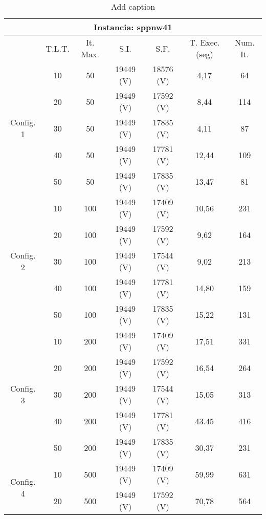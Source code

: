 \begin{table}[htbp]
  \centering
  \caption{Add caption}
    \begin{tabular}{rcccccc}
    \toprule
    \multicolumn{7}{c}{Instancia: sppnw41} \\
    \midrule
          & T.L.T. & It. Max. & S.I.  & S.F.  & T. Exec. (seg) & Num. It. \\
    \multicolumn{1}{c}{\multirow{5}[2]{*}{Config. 1}} & 10    & 50    & 19449 (V) & 18576 (V) & 4,17  & 64 \\
    \multicolumn{1}{c}{} & 20    & 50    & 19449 (V) & 17592 (V) & 8,44  & 114 \\
    \multicolumn{1}{c}{} & 30    & 50    & 19449 (V) & 17835 (V) & 4,11  & 87 \\
    \multicolumn{1}{c}{} & 40    & 50    & 19449 (V) & 17781 (V) & 12,44 & 109 \\
    \multicolumn{1}{c}{} & 50    & 50    & 19449 (V) & 17835 (V) & 13,47 & 81 \\
    \multicolumn{1}{c}{\multirow{5}[2]{*}{Config. 2}} & 10    & 100   & 19449 (V) & 17409 (V) & 10,56 & 231 \\
    \multicolumn{1}{c}{} & 20    & 100   & 19449 (V) & 17592 (V) & 9,62  & 164 \\
    \multicolumn{1}{c}{} & 30    & 100   & 19449 (V) & 17544 (V) & 9,02  & 213 \\
    \multicolumn{1}{c}{} & 40    & 100   & 19449 (V) & 17781 (V) & 14,80 & 159 \\
    \multicolumn{1}{c}{} & 50    & 100   & 19449 (V) & 17835 (V) & 15,22 & 131 \\
    \multicolumn{1}{c}{\multirow{5}[2]{*}{Config. 3}} & 10    & 200   & 19449 (V) & 17409 (V) & 17,51 & 331 \\
    \multicolumn{1}{c}{} & 20    & 200   & 19449 (V) & 17592 (V) & 16,54 & 264 \\
    \multicolumn{1}{c}{} & 30    & 200   & 19449 (V) & 17544 (V) & 15,05 & 313 \\
    \multicolumn{1}{c}{} & 40    & 200   & 19449 (V) & 17781 (V) & 43.45 & 416 \\
    \multicolumn{1}{c}{} & 50    & 200   & 19449 (V) & 17835 (V) & 30,37 & 231 \\
    \multicolumn{1}{c}{\multirow{5}[2]{*}{Config. 4}} & 10    & 500   & 19449 (V) & 17409 (V) & 59,99 & 631 \\
    \multicolumn{1}{c}{} & 20    & 500   & 19449 (V) & 17592 (V) & 70,78 & 564 \\

\end{tabular}
\end{table}
